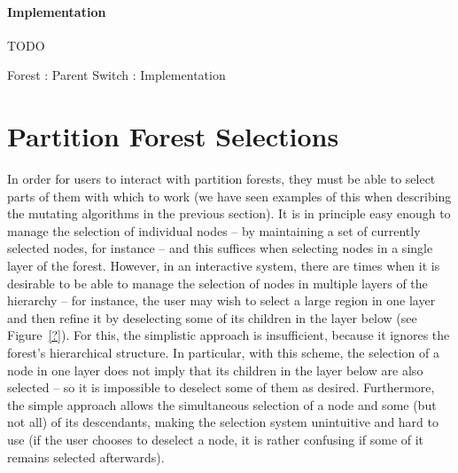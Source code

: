 \paragraph{Implementation}

TODO

\begin{stulisting}[p]
\caption{Forest : Parent Switch : Implementation}
\label{code:ipfs-forest-parentswitch}

\end{stulisting}

\afterpage{\clearpage}
\newpage

\section{Partition Forest Selections}

In order for users to interact with partition forests, they must be able to select parts of them with which to work (we have seen examples of this when describing the mutating algorithms in the previous section). It is in principle easy enough to manage the selection of individual nodes -- by maintaining a set of currently selected nodes, for instance -- and this suffices when selecting nodes in a single layer of the forest. However, in an interactive system, there are times when it is desirable to be able to manage the selection of nodes in multiple layers of the hierarchy -- for instance, the user may wish to select a large region in one layer and then refine it by deselecting some of its children in the layer below (see Figure~\ref{?}). For this, the simplistic approach is insufficient, because it ignores the forest's hierarchical structure. In particular, with this scheme, the selection of a node in one layer does not imply that its children in the layer below are also selected -- so it is impossible to deselect some of them as desired. Furthermore, the simple approach allows the simultaneous selection of a node and some (but not all) of its descendants, making the selection system unintuitive and hard to use (if the user chooses to deselect a node, it is rather confusing if some of it remains selected afterwards).

